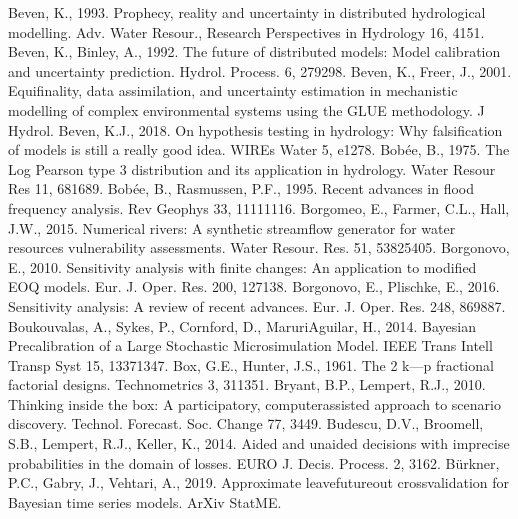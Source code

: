 \documentclass[letterpaper,10pt,english]{sphinxmanual}
\begin{document}
Beven, K., 1993. Prophecy, reality and uncertainty in distributed hydrological modelling. Adv. Water Resour., Research Perspectives in Hydrology 16, 41\textendash{}51. 
Beven, K., Binley, A., 1992. The future of distributed models: Model calibration and uncertainty prediction. Hydrol. Process. 6, 279\textendash{}298. 
Beven, K., Freer, J., 2001. Equifinality, data assimilation, and uncertainty estimation in mechanistic modelling of complex environmental systems using the GLUE methodology. J Hydrol.
Beven, K.J., 2018. On hypothesis testing in hydrology: Why falsification of models is still a really good idea. WIREs Water 5, e1278. 
Bobée, B., 1975. The Log Pearson type 3 distribution and its application in hydrology. Water Resour Res 11, 681\textendash{}689. 
Bobée, B., Rasmussen, P.F., 1995. Recent advances in flood frequency analysis. Rev Geophys 33, 1111\textendash{}1116. 
Borgomeo, E., Farmer, C.L., Hall, J.W., 2015. Numerical rivers: A synthetic streamflow generator for water resources vulnerability assessments. Water Resour. Res. 51, 5382\textendash{}5405. 
Borgonovo, E., 2010. Sensitivity analysis with finite changes: An application to modified EOQ models. Eur. J. Oper. Res. 200, 127\textendash{}138.
Borgonovo, E., Plischke, E., 2016. Sensitivity analysis: A review of recent advances. Eur. J. Oper. Res. 248, 869\textendash{}887. 
Boukouvalas, A., Sykes, P., Cornford, D., Maruri\sphinxhyphen{}Aguilar, H., 2014. Bayesian Precalibration of a Large Stochastic Microsimulation Model. IEEE Trans Intell Transp Syst 15, 1337\textendash{}1347. 
Box, G.E., Hunter, J.S., 1961. The 2 k—p fractional factorial designs. Technometrics 3, 311\textendash{}351.
Bryant, B.P., Lempert, R.J., 2010. Thinking inside the box: A participatory, computer\sphinxhyphen{}assisted approach to scenario discovery. Technol. Forecast. Soc. Change 77, 34\textendash{}49. 
Budescu, D.V., Broomell, S.B., Lempert, R.J., Keller, K., 2014. Aided and unaided decisions with imprecise probabilities in the domain of losses. EURO J. Decis. Process. 2, 31\textendash{}62. 
Bürkner, P.\sphinxhyphen{}C., Gabry, J., Vehtari, A., 2019. Approximate leave\sphinxhyphen{}future\sphinxhyphen{}out cross\sphinxhyphen{}validation for Bayesian time series models. ArXiv StatME.
\end{document}
